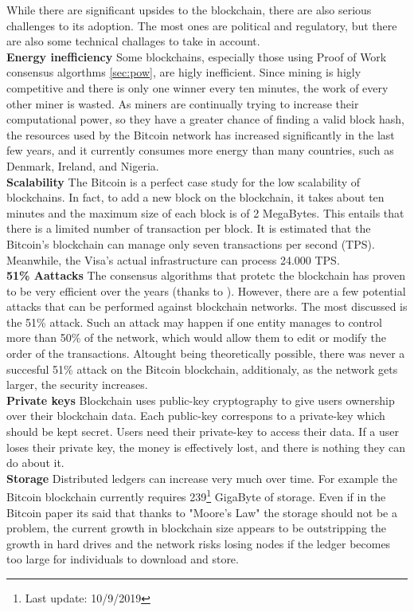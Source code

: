 While there are significant upsides to the blockchain, there are also serious 
challenges to its adoption. The most ones are political and regulatory, but 
there are also some technical challages to take in account.
\bigskip\\
\textbf{Energy inefficiency}
Some blockchains, especially those using Proof of Work consensus algorthms \ref{sec:pow}, are 
higly inefficient. Since mining is higly competitive and there is 
only one winner every ten minutes, the work of every other miner is wasted.
As miners are continually trying to increase their computational power, 
so they have a greater chance of finding a valid block hash, the resources used 
by the Bitcoin network has increased significantly in the last few years, and it 
currently consumes more energy than many countries, such as Denmark, Ireland, 
and Nigeria.\cite{binancevision}
\bigskip\\
\textbf{Scalability}
The Bitcoin is a perfect case study for the low scalability of blockchains.
In fact, to add a new block on the blockchain, it takes about ten minutes and
the maximum size of each block is of 2 MegaBytes. This entails that there is a
limited number of transaction per block. It is estimated that the Bitcoin's 
blockchain can manage only seven transactions per second (TPS). Meanwhile, the
Visa's actual infrastructure can process 24.000 TPS.
\bigskip\\
\textbf{51\% Aattacks}
The consensus algorithms that protetc the blockchain has proven to be very 
efficient over the years (thanks to ). However, there are a few potential attacks that can 
be performed against blockchain networks. The most discussed is the  51\% attack.
Such an attack may happen if one entity manages to control more than 50\% of the 
network, which would allow them to edit or modify the order of the transactions.
Altought being theoretically possible, there was never a succesful 51\% attack on 
the Bitcoin blockchain, additionaly, as the network gets larger, the security 
increases.\cite{binancevision}
\bigskip\\
\textbf{Private keys} 
Blockchain uses public-key cryptography to give users ownership over their blockchain data.
Each public-key correspons to a private-key which should be kept secret. Users need their 
private-key to access their data. If a user loses their private key, the money is 
effectively lost, and there is nothing they can do about it.\cite{binancevision}
\bigskip\\
\textbf{Storage}
Distributed ledgers can increase very much over time. For example the Bitcoin blockchain
currently requires 239\footnote{Last update: 10/9/2019} GigaByte of storage. Even if in 
the Bitcoin paper its said that thanks to "Moore's Law"\cite{bitcoin} the storage should
not be a problem, the current growth in blockchain size appears to be outstripping the growth
in hard drives and the network risks losing nodes if the ledger becomes too large for 
individuals to download and store.\cite{binancevision}
